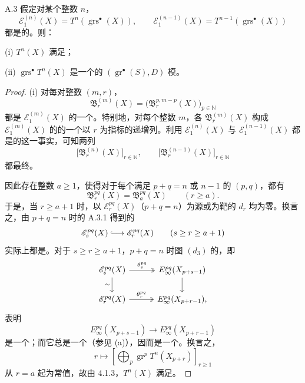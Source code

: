 \begin{SGAresult}{}{A.3}
假定对某个整数 $n$，
\[
\mathscr E_1^{(n)}(X)=T^n(\operatorname{grs}^{\bullet}(X)),\qquad
\mathscr E_1^{(n-1)}(X)=T^{n-1}(\operatorname{grs}^{\bullet}(X))
\]
都是的。则：

(i) $T^n(X)$ 满足；

(ii) $\operatorname{grs}^{\bullet}T^n(X)$ 是一个的 $(\operatorname{gr}^{\bullet}(S),D)$ 模。
\end{SGAresult}
\begin{proof}
(i) 对每对整数 $(m,r)$，
\[
\mathfrak B_r^{(m)}(X)=\bigl(\mathfrak B_r^{p,m-p}(X)\bigr)_{p\in\mathbb N}
\]
都是 $\mathscr E_1^{(m)}(X)$ 的一个。特别地，对每个整数 $m$，各 $\mathfrak B_r^{(m)}(X)$ 构成 $\mathscr E_1^{(m)}(X)$ 的的一个以 $r$ 为指标的递增列。利用 $\mathscr E_1^{(n)}(X)$ 与 $\mathscr E_1^{(n-1)}(X)$ 都是的这一事实，可知两列
\[
\bigl[\mathfrak B_r^{(n)}(X)\bigr]_{r\in\mathbb N},\qquad
\bigl[\mathfrak B_r^{(n-1)}(X)\bigr]_{r\in\mathbb N}
\]
都最终。

因此存在整数 $a\geq1$，使得对于每个满足 $p+q=n$ 或 $n-1$ 的 $(p,q)$，都有
\[
\mathfrak B_r^{pq}(X)=\mathfrak B_a^{pq}(X)\qquad(r\geq a).
\tag{A.3.1}
\]
于是，当 $r\geq a+1$ 时，以 $\mathscr E_r^{pq}(X)$（$p+q=n$）为源或为靶的 $d_r$ 均为零。换言之，由 $p+q=n$ 时的 A.3.1 得到的
\[
\mathscr E_s^{pq}(X)\lhook\joinrel\longrightarrow\mathscr E_r^{pq}(X)\qquad(s\geq r\geq a+1)
\]
实际上都是。对于 $s\geq r\geq a+1$，$p+q=n$ 时图 $(d_3)$ 的，即
\[
\begin{tikzcd}[column sep=3em]
\mathscr E_s^{pq}(X)\arrow[r,"\theta_s^{pq}",two heads]\arrow[d,"\sim"']&E_\infty^{pq}(X_{p+s-1})\arrow[d]\\
\mathscr E_r^{pq}(X)\arrow[r,"\theta_r^{pq}",two heads]&E_\infty^{pq}(X_{p+r-1}),
\end{tikzcd}
\]
表明
\[
E_\infty^{pq}(X_{p+s-1})\longrightarrow E_\infty^{pq}(X_{p+r-1})
\]
是一个；而它总是一个（参见 (a)），因而是一个。换言之，
\[
r\longmapsto\left[\bigoplus_p\operatorname{gr}^pT^n(X_{p+r})\right]_{r\geq1}
\]
从 $r=a$ 起为常值，故由 4.1.3，$T^n(X)$ 满足。


\end{proof}
